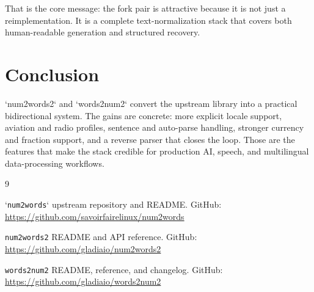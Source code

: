 \documentclass{article}
\begin{document}
That is the core message: the fork pair is attractive because it is not just a
reimplementation. It is a complete text-normalization stack that covers both
human-readable generation and structured recovery.

\section{Conclusion}
`num2words2` and `words2num2` convert the upstream library into a practical
bidirectional system. The gains are concrete: more explicit locale support,
aviation and radio profiles, sentence and auto-parse handling, stronger
currency and fraction support, and a reverse parser that closes the loop.
Those are the features that make the stack credible for production AI, speech,
and multilingual data-processing workflows.

\begin{thebibliography}{9}

`\texttt{num2words}` upstream repository and README. GitHub:
\url{https://github.com/savoirfairelinux/num2words}

\texttt{num2words2} README and API reference. GitHub:
\url{https://github.com/gladiaio/num2words2}

\texttt{words2num2} README, reference, and changelog. GitHub:
\url{https://github.com/gladiaio/words2num2}

\end{thebibliography}
\end{document}
